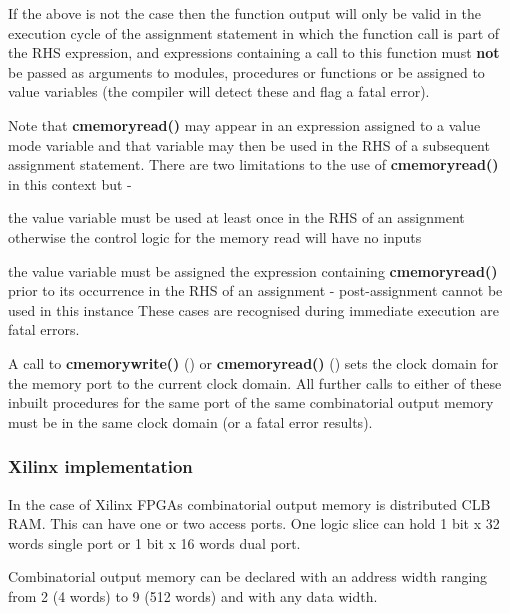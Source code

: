            If the above is not the case then the function output will only
            be valid in the execution cycle of the assignment statement in
            which the function call is part of the RHS expression, and
            expressions containing a call to this function must {\bf not} be
            passed as arguments to modules, procedures or functions or be
            assigned to value variables (the compiler will detect these and
            flag a fatal error).
            
            Note that {\bf cmemoryread()} may appear in an expression assigned
            to a value mode variable and that variable may then be used in the
            RHS of a subsequent assignment statement. There are two limitations
            to the use of {\bf cmemoryread()} in this context but -
            \blist
            \item   the value variable must be used at least once in the RHS of
                    an assignment otherwise the control logic for the memory
                    read will have no inputs
            \item   the value variable must be assigned the expression
                    containing {\bf cmemoryread()} prior to its occurrence
                    in the RHS of an assignment - post-assignment cannot
                    be used in this instance
            \blend
            These cases are recognised during immediate execution are fatal
            errors.
        
            A call to {\bf cmemorywrite()} () or {\bf cmemoryread()}
            () sets the clock domain for the memory port to the
            current clock domain. All further calls to either of these inbuilt
            procedures for the same port of the same combinatorial output memory
            must be in the same clock domain (or a fatal error results).

            \subsubsection{Xilinx implementation}

                In the case of Xilinx FPGAs combinatorial output memory is
                distributed CLB RAM. This can have one or two access ports.
                One logic slice can hold 1 bit x 32 words single port or 1
                bit x 16 words dual port.

                Combinatorial output memory can be declared with an address
                width ranging from 2 (4 words) to 9 (512 words) and with any
                data width.

